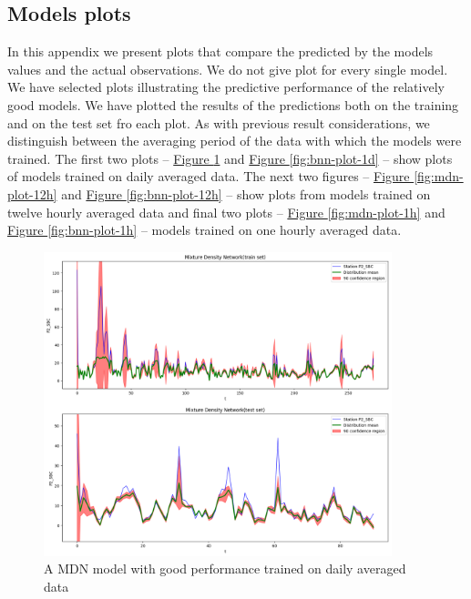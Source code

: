 \documentclass[12pt,a4paper,twoside]{scrartcl}
\numberwithin{equation}{section}
\newcommand{\reffig}[1]{\hyperref[#1]{Figure \ref*{#1}}}
\newcounter{mypagecount}%
\newenvironment{interlude}{%
  \clearpage
  \setcounter{mypagecount}{\value{page}}%
  \thispagestyle{empty}%
  \pagestyle{empty}%
}{%
  \clearpage
  \setcounter{page}{\value{mypagecount}}%
}
\let\chapter=\section %
\begin{document}
\begin{interlude}
\begin{appendices}
    \clearpage
    \chapter{Models plots}
    In this appendix we present plots that compare the predicted by the models values and the actual observations. We do not give plot for every single model. We have selected plots illustrating the predictive performance of the relatively good models. We have plotted the results of the predictions both on the training and on the test set fro each plot. As with previous result considerations, we distinguish between the averaging period of the data with which the models were trained. The first two plots -- \reffig{fig:mdn-plot-1d} and \reffig{fig:bnn-plot-1d} -- show plots of models trained on daily averaged data. The next two figures -- \reffig{fig:mdn-plot-12h} and \reffig{fig:bnn-plot-12h} -- show plots from models trained on twelve hourly averaged data and final two plots -- \reffig{fig:mdn-plot-1h} and \reffig{fig:bnn-plot-1h} -- models trained on one hourly averaged data.
    \begin{center}
      \begin{figure}[h!]
        \centering
        \includegraphics[height=0.75\textwidth, width=0.9\textwidth]{figures/model_plots/mdn_1d}
        \caption[MDN one day plot]{A MDN model with good performance trained on daily averaged data}\label{fig:mdn-plot-1d}
      \end{figure}
    \end{center}
    \begin{center}
      \begin{figure}[h!]

\end{figure}
\end{center}
\end{appendices}
\end{interlude}
\end{document}
